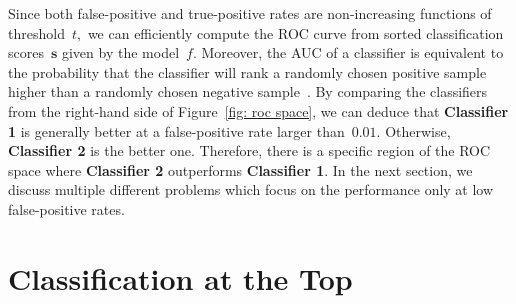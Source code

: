 Since both false-positive and true-positive rates are non-increasing functions of threshold~$t,$ we can efficiently compute the ROC curve from sorted classification scores~$\bm{s}$ given by the model~$f.$ Moreover, the AUC of a classifier is equivalent to the probability that the classifier will rank a randomly chosen positive sample higher than a randomly chosen negative sample~\cite{fawcett2006introduction}. By comparing the classifiers from the right-hand side of Figure~\ref{fig: roc space}, we can deduce that \textbf{Classifier 1} is generally better at a false-positive rate larger than~$0.01.$ Otherwise, \textbf{Classifier 2} is the better one. Therefore,  there is a specific region of the ROC space where \textbf{Classifier 2} outperforms \textbf{Classifier 1}. In the next section, we discuss multiple different problems which focus on the performance only at low false-positive rates.

\section{Classification at the Top}\label{sec: related problems}

